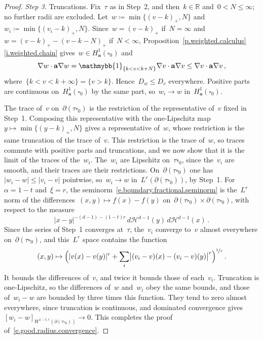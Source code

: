 \documentclass[11pt,letterpaper]{article}
\numberwithin{equation}{section}
\theoremstyle{definition}
\newcommand{\R}{\mathbb{R}}
\renewcommand{\a}{\mathbf{a}}
\newcommand{\nf}{\nicefrac}
\newcommand{\cu}{\square}
\newcommand{\indc}{{\mathmybb{1}}}
\begin{document}
\begin{proof}
\smallskip

\emph{Step 3.} Truncations. Fix~$\tau$ as in Step~2, and then~$k\in\R$ and~$0<N\leq\infty$; no further radii are excluded. Let~$w\coloneqq\min\{(v-k)_+,N\}$ and~$w_i\coloneqq\min\{(v_i-k)_+,N\}$. Since~$w=(v-k)_+$ if~$N=\infty$ and~$w=(v-k)_+-(v-k-N)_+$ if~$N<\infty$, Proposition~\ref{p.weighted.calculus}\ref{i.weighted.chain} gives~$w\in H^1_\a(\cu_0)$ and
\begin{equation*}
	\nabla w\cdot\a\nabla w=\indc_{\{k<v<k+N\}}\nabla v\cdot\a\nabla v\leq\nabla v\cdot\a\nabla v\,,
\end{equation*}
where~$\{k<v<k+\infty\}=\{v>k\}$. Hence~$D_w\leq D_v$ everywhere. Positive parts are continuous on~$H^1_\a(\cu_0)$ by the same part, so~$w_i\to w$ in~$H^1_\a(\cu_0)$.

\smallskip

The trace of~$v$ on~$\partial(\tau\cu_0)$ is the restriction of the representative of~$v$ fixed in Step~1. Composing this representative with the one-Lipschitz map~$y\mapsto\min\{(y-k)_+,N\}$ gives a representative of~$w$, whose restriction is the same truncation of the trace of~$v$. This restriction is the trace of~$w$, so traces commute with positive parts and truncations, and we now show that it is the limit of the traces of the~$w_i$. The~$w_i$ are Lipschitz on~$\tau\overline{\cu}_0$, since the~$v_i$ are smooth, and their traces are their restrictions. On~$\partial(\tau\cu_0)$ one has~$|w_i-w|\leq|v_i-v|$ pointwise, so~$w_i\to w$ in~$L^r(\partial(\tau\cu_0))$, by Step~1. For~$\alpha=1-t$ and~$\xi=r$, the seminorm~\eqref{e.boundary.fractional.seminorm} is the~$L^r$ norm of the differences~$(x,y)\mapsto f(x)-f(y)$ on~$\partial(\tau\cu_0)\times\partial(\tau\cu_0)$, with respect to the measure
\begin{equation*}
	|x-y|^{-(d-1)-(1-t)r}\,d\mathcal H^{d-1}(y)\,d\mathcal H^{d-1}(x)\,.
\end{equation*}
Since the series of Step~1 converges at~$\tau$, the~$v_i$ converge to~$v$ almost everywhere on~$\partial(\tau\cu_0)$, and this~$L^r$ space contains the function
\begin{equation*}
	(x,y)\mapsto\Bigl(|v(x)-v(y)|^r+\sum_i\bigl|(v_i-v)(x)-(v_i-v)(y)\bigr|^r\Bigr)^{\nf1r}\,.
\end{equation*}
It bounds the differences of~$v$, and twice it bounds those of each~$v_i$. Truncation is one-Lipschitz, so the differences of~$w$ and~$w_i$ obey the same bounds, and those of~$w_i-w$ are bounded by three times this function. They tend to zero almost everywhere, since truncation is continuous, and dominated convergence gives~$[w_i-w]_{W^{1-t,r}(\partial(\tau\cu_0))}\to0$. This completes the proof of~\eqref{e.good.radius.convergence}.
\end{proof}
\end{document}
